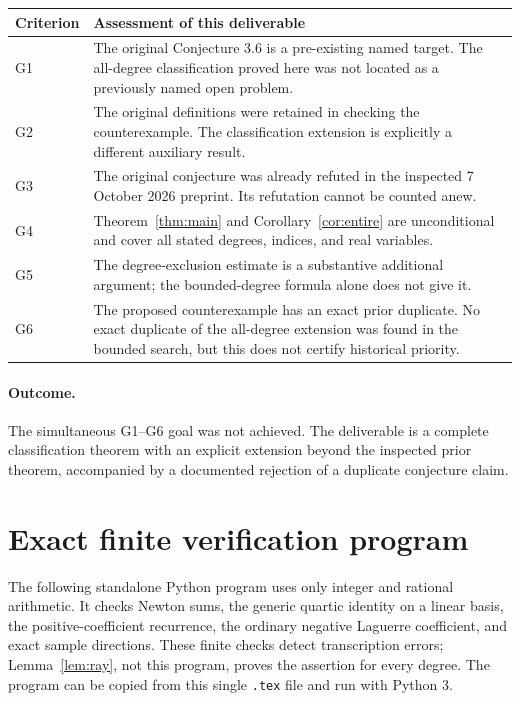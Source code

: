 \documentclass[11pt,a4paper]{article}
\theoremstyle{remark}\newtheorem{remark}[theorem]{Remark}
\begin{document}
\begin{center}
\begin{tabular}{@{}p{}p{}@{}}
\toprule
Criterion & Assessment of this deliverable \\
\midrule
G1 & The original Conjecture 3.6 is a pre-existing named target. The
all-degree classification proved here was not located as a previously
named open problem. \\
G2 & The original definitions were retained in checking the counterexample.
The classification extension is explicitly a different auxiliary result. \\
G3 & The original conjecture was already refuted in the inspected
7 October 2026 preprint. Its refutation cannot be counted anew. \\
G4 & Theorem~\ref{thm:main} and Corollary~\ref{cor:entire} are unconditional
and cover all stated degrees, indices, and real variables. \\
G5 & The degree-exclusion estimate is a substantive additional argument;
the bounded-degree formula alone does not give it. \\
G6 & The proposed counterexample has an exact prior duplicate. No exact
duplicate of the all-degree extension was found in the bounded search,
but this does not certify historical priority. \\
\bottomrule
\end{tabular}
\end{center}

\paragraph{Outcome.}
The simultaneous G1--G6 goal was not achieved. The deliverable is a
complete classification theorem with an explicit extension beyond the
inspected prior theorem, accompanied by a documented rejection of a
duplicate conjecture claim.

\clearpage
\appendix
\section{Exact finite verification program}\label{app:verify}

The following standalone Python program uses only integer and rational
arithmetic. It checks Newton sums, the generic quartic identity on a
linear basis, the positive-coefficient recurrence, the ordinary negative
Laguerre coefficient, and exact sample directions. These finite checks
detect transcription errors; Lemma~\ref{lem:ray}, not this program,
proves the assertion for every degree. The program can be copied from
this single \texttt{.tex} file and run with Python 3.
\end{document}
